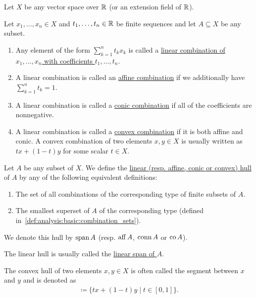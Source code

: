 Let $X$ be any vector space over $\mathbb{R}$ (or an extension field of $\mathbb{R}$).

\begin{definition}\label{def:analysis:basic:combinations}
  Let $x_1, \ldots, x_n \in X$ and $t_1, \ldots, t_n \in \mathbb{R}$ be finite sequences and let $A \subseteq X$ be any subset.

  \begin{enumerate}
    \item Any element of the form $\sum_{k=1}^n t_k x_k$ is called a \uline{linear combination of $x_1, \ldots, x_n$ with coefficients $t_1, \ldots, t_n$}.
    \item A linear combination is called an \uline{affine combination} if we additionally have $\sum_{k=1}^n t_k = 1$.
    \item A linear combination is called a \uline{conic combination} if all of the coefficients are nonnegative.
    \item A linear combination is called a \uline{convex combination} if it is both affine and conic. A convex combination of two elements $x, y \in X$ is usually written as $tx + (1-t)y$ for some scalar $t \in X$.
  \end{enumerate}
\end{definition}

\begin{definition}\label{def:analysis:basic:hulls}
  Let $A$ be any subset of $X$. We define the \uline{linear (resp. affine, conic or convex) hull} of $A$ by any of the following equivalent definitions:
  \begin{enumerate}
    \item The set of all combinations of the corresponding type of finite subsets of $A$.
    \item The smallest superset of $A$ of the corresponding type (defined in~\ref{def:analysis:basic:combination_sets}).
  \end{enumerate}

  We denote this hull by $\operatorname{span} A$ (resp. $\operatorname{aff} A$, $\operatorname{conn} A$ or $\operatorname{co} A$).

  The linear hull is usually called the \uline{linear span of $A$}.

  The convex hull of two elements $x, y \in X$ is often called the segment between $x$ and $y$ and is denoted as
  \begin{align*}
    [x, y] \coloneqq \{ tx + (1-t)y \mid t \in [0, 1] \}.
  \end{align*}
\end{definition}

